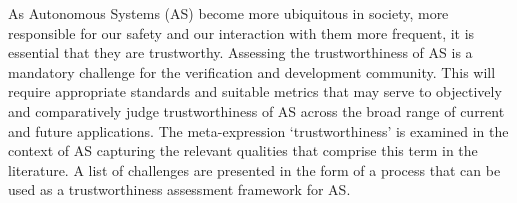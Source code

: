 As Autonomous Systems (AS) become more ubiquitous in society, more responsible for our safety and our interaction with them more frequent, it is essential that they are trustworthy. Assessing the trustworthiness of AS is a mandatory challenge for the verification and development community. This will require appropriate standards and suitable metrics that may serve to objectively and comparatively judge trustworthiness of AS across the broad range of current and future applications.
%
%
The meta-expression `trustworthiness' is examined in the context of AS capturing the relevant qualities that comprise this term in the literature. 
%
A list of challenges are presented in the form of a process that can be used as a trustworthiness assessment framework for AS. 

